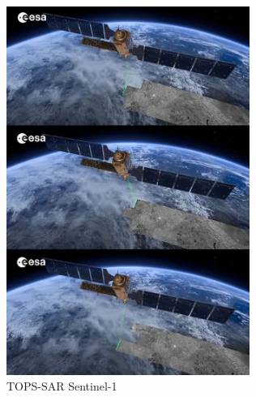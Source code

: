 \begin{figure}[h]
    \centering
    \includegraphics[height=12cm]{archivos/tfg/imgbarrido} %
    \caption{TOPS-SAR Sentinel-1 \cite{yts1}}
    \label{fig:sarb}
\end{figure}

